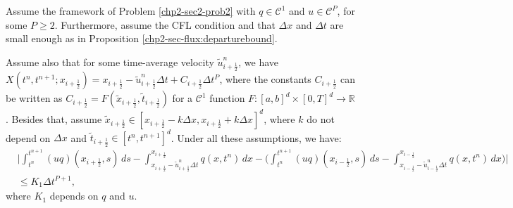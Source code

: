 \begin{prop}
	\label{chp2-sec-flux:prop2}
	Assume the framework of Problem \ref{chp2-sec2-prob2} with $q \in \mathcal{C}^1$  and $u \in \mathcal{C}^P$, for some $P\geq2$. 
	Furthermore, assume the CFL condition and that $\Delta x$ and $ \Delta t $ are small enough as in Proposition \ref{chp2-sec-flux:departurebound}.
	
	Assume also that for some time-average velocity $\tilde{u}^n_{i+\frac{1}{2}}$, we have
	$X(t^n,t^{n+1};x_{i+\frac{1}{2}}) = x_{i+\frac{1}{2}} - \tilde{u}^n_{i+\frac{1}{2}}\Delta t + C_{i+\frac{1}{2}}\Delta t^P$, 
	where the constants $C_{i+\frac{1}{2}}$ can be written as $C_{i+\frac{1}{2}} = F(\tilde{x}_{i+\frac{1}{2}}, \tilde{t}_{i+\frac{1}{2}})$ for 
	a $\mathcal{C}^1$ function $F:[a,b]^d \times [0,T]^d \to \mathbb{R}$ . 
	Besides that, assume $\tilde{x}_{i+\frac{1}{2}} \in [x_{i+\frac{1}{2}}-k\Delta x, x_{i+\frac{1}{2}} + k\Delta x]^d$, 
	where $k$ do not depend on $\Delta x$ and $\tilde{t}_{i+\frac{1}{2}} \in [t^n, t^{n+1}]^d$.
	Under all these assumptions, we have:
\begin{align*}
	&\bigg|\int_{t^n}^{t^{n+1}} (uq)(x_{i+\frac{1}{2}},s) \,ds 
	-\int^{x_{i+\frac{1}{2}}}_{x_{i+\frac{1}{2}}-\tilde{u}_{i+\frac{1}{2}}^n \Delta t} q(x,t^n)\,dx
	-\bigg( \int_{t^n}^{t^{n+1}} (uq)(x_{i-\frac{1}{2}},s) \,ds 
	-\int^{x_{i-\frac{1}{2}}}_{x_{i-\frac{1}{2}}-\tilde{u}_{i-\frac{1}{2}}^n \Delta t} q(x,t^n)\,dx  \bigg) \bigg| \\
	& \leq K_1 \Delta t^{P+1},
\end{align*}
	where $K_1$ depends on $q$ and $u$.
\end{prop}
